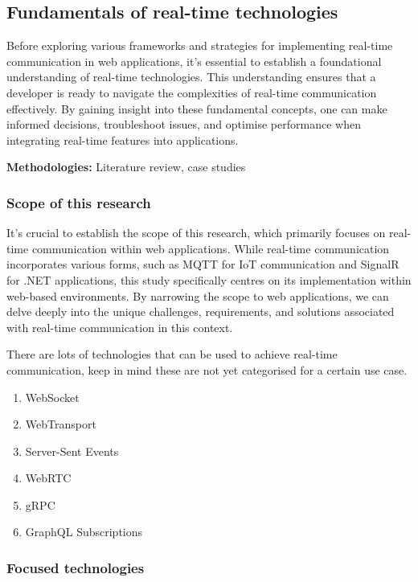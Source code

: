 \subsection{Fundamentals of real-time technologies}

Before exploring various frameworks and strategies for implementing real-time communication in web applications, it's essential to establish a foundational understanding of real-time technologies. This understanding ensures that a developer is ready to navigate the complexities of real-time communication effectively. By gaining insight into these fundamental concepts, one can make informed decisions, troubleshoot issues, and optimise performance when integrating real-time features into applications.

\textbf{Methodologies:} Literature review, case studies

\subsubsection{Scope of this research}

It's crucial to establish the scope of this research, which primarily focuses on real-time communication within web applications. While real-time communication incorporates various forms, such as MQTT for IoT communication and SignalR for .NET applications, this study specifically centres on its implementation within web-based environments. By narrowing the scope to web applications, we can delve deeply into the unique challenges, requirements, and solutions associated with real-time communication in this context.

There are lots of technologies \cite{alby-ws-alt} that can be used to achieve real-time communication, keep in mind these are not yet categorised for a certain use case.

\begin{enumerate}
  \item WebSocket
  \item WebTransport
  \item Server-Sent Events
  \item WebRTC
  \item gRPC
  \item GraphQL Subscriptions
\end{enumerate}

\pagebreak

\subsubsection{Focused technologies}

